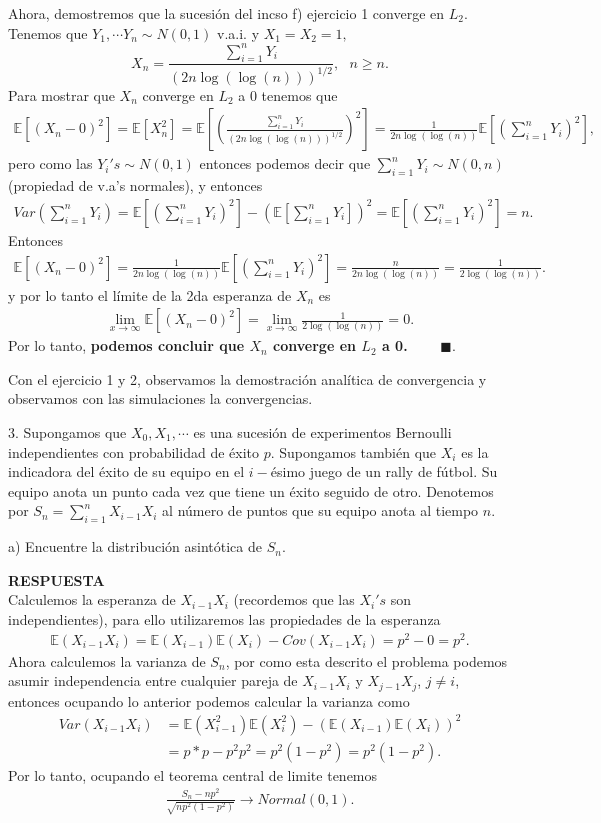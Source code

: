 \documentclass[11pt,letterpaper]{article}
\newcommand{\mE}{\mathbb{E}}
\newcommand{\res}{\textbf{RESPUESTA}\\}
\newcommand{\fin}{$\blacksquare.$}
\newcommand{\s}{\sum_{i=1}^n}
\begin{document}
Ahora, demostremos que la sucesión del incso f) ejercicio 1 converge en $L_2$. Tenemos que $Y_1,\cdots Y_n\sim N(0,1)$ v.a.i. y $X_1=X_2=1,$
$$X_n=\frac{\s Y_i}{\left(2n\log(\log (n)) \right)^{1/2}}, \ \ \ n\geq n.$$
Para mostrar que $X_n$ converge en $L_2$ a 0 tenemos que 
\begin{align*}
\mE[(X_n-0)^2]= \mE[X_n^2]=\mE\left[\left( \frac{\s Y_i}{\left(2n\log(\log (n)) \right)^{1/2}}\right)^2 \right]=\frac{1}{2n\log(\log (n))}\mE\left[\left( \s Y_i\right)^2 \right],
\end{align*}
pero como las $Y_i's\sim N(0,1)$ entonces podemos decir que $\s Y_i\sim N(0,n)$ (propiedad de v.a's normales), y entonces
\begin{align*}
Var\left(\s Y_i\right) = \mE\left[ \left(\s Y_i \right)^2\right]-\left(\mE\left[ \s Y_i\right] \right)^2 = \mE\left[ \left(\s Y_i \right)^2\right] = n.
\end{align*}
Entonces
\begin{align*}
\mE[(X_n-0)^2]=\frac{1}{2n\log(\log (n))}\mE\left[\left( \s Y_i\right)^2 \right]=\frac{n}{2n\log(\log (n))}=\frac{1}{2\log(\log (n))}.
\end{align*}
y por lo tanto el límite de la 2da esperanza de $X_n$ es 
\begin{align*}
\lim_{x\rightarrow \infty} \mE[(X_n-0)^2]=\lim_{x\rightarrow \infty}\frac{1}{2\log(\log (n))}=0.
\end{align*}
Por lo tanto, \textbf{podemos concluir que $X_n$ converge en $L_2$ a 0.} \ \ \ \ \fin

Con el ejercicio 1 y 2, observamos la demostración analítica de convergencia y observamos con las simulaciones la convergencias.

3. Supongamos que $X_0 , X_1 , \cdots$ es una sucesión de experimentos Bernoulli independientes con probabilidad de éxito $p$. Supongamos también que $X_i$ es la indicadora del éxito de su equipo en el $i-$ésimo juego de un rally de fútbol. Su equipo anota un punto cada vez que tiene un éxito seguido de otro. Denotemos por $S_n =\s X_{i-1} X_i$ al número de puntos que su equipo
anota al tiempo $n$.

a) Encuentre la distribución asintótica de $S_n$.

\res Calculemos la esperanza de $X_{i-1}X_i$ (recordemos que las $X_i's$ son independientes), para ello utilizaremos las propiedades de la esperanza
\begin{align*}
\mE\left(X_{i-1} X_i\right)= \mE(X_{i-1})\mE(X_i)-Cov(X_{i-1} X_i)=p^2-0 =p^2.
\end{align*}
Ahora calculemos la varianza de $S_n$, por como esta descrito el problema podemos asumir independencia entre cualquier pareja de $X_{i-1}X_i$ y $X_{j-1}X_j$, $j\neq i$, entonces ocupando lo anterior podemos calcular la varianza como
\begin{align*}
Var(X_{i-1}X_i)&=\mE(X_{i-1}^2)\mE(X_i^2)-\left(\mE(X_{i-1})\mE(X_i)\right)^2\\
&= p*p-p^2p^2= p^2(1-p^2)=p^2(1-p^2).
\end{align*}
Por lo tanto, ocupando el teorema central de limite tenemos 
\begin{align*}
\frac{S_n-np^2}{\sqrt{np^2(1-p^2)}} \rightarrow Normal(0,1).
\end{align*}
\end{document}
